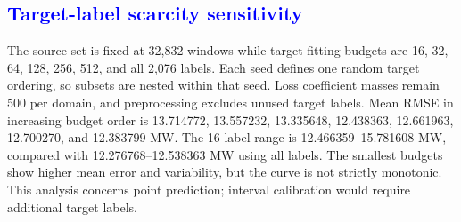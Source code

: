 \begin{table}[pos=htbp]
\centering
\color{blue}
\small
\caption{\textcolor{blue}{Cross-farm supervised adaptation with exactly 128 target fitting labels; source normals come from the other five farms. Target-only fitting uses the same selected labels. Interval calibration labels are additional and reported separately. Fixed parameters are not claimed optimal.}}
\label{tab:chronological_crossfarm_interval}
\end{table}

\FloatBarrier

\subsection{\textcolor{blue}{Target-label scarcity sensitivity}}
{\color{blue}The source set is fixed at 32,832 windows while target fitting budgets are 16, 32, 64, 128, 256, 512, and all 2,076 labels. Each seed defines one random target ordering, so subsets are nested within that seed. Loss coefficient masses remain 500 per domain, and preprocessing excludes unused target labels. Mean RMSE in increasing budget order is 13.714772, 13.557232, 13.335648, 12.438363, 12.661963, 12.700270, and 12.383799 MW. The 16-label range is 12.466359--15.781608 MW, compared with 12.276768--12.538363 MW using all labels. The smallest budgets show higher mean error and variability, but the curve is not strictly monotonic. This analysis concerns point prediction; interval calibration would require additional target labels.}

